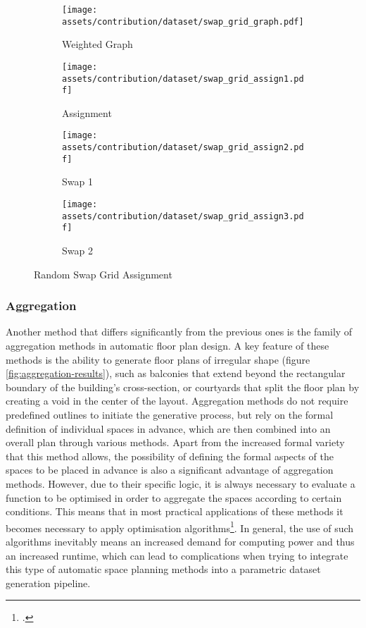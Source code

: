 \documentclass[a4paper, 12pt]{report}
\begin{document}
\begin{figure}
\centering
\begin{subfigure}{.25\textwidth}
\centering
\texttt{[image: assets/contribution/dataset/swap\_grid\_graph.pdf]}
\caption{Weighted Graph}
\label{fig:weighted-graph-3}
\end{subfigure}%
\begin{subfigure}{.25\textwidth}
\centering
\texttt{[image: assets/contribution/dataset/swap\_grid\_assign1.pdf]}
\caption{Assignment}
\label{fig:assignment}
\end{subfigure}%
\begin{subfigure}{.25\textwidth}
\centering
\texttt{[image: assets/contribution/dataset/swap\_grid\_assign2.pdf]}
\caption{Swap 1}
\label{fig:swap-1}
\end{subfigure}%
\begin{subfigure}{.25\textwidth}
\centering
\texttt{[image: assets/contribution/dataset/swap\_grid\_assign3.pdf]}
\caption{Swap 2}
\label{fig:swap-2}
\end{subfigure}
\caption{Random Swap Grid Assignment}
\label{fig:random-swap-grid-assignment}
\end{figure}

\subsubsection{Aggregation}\label{subsubsec:aggregation}

Another method that differs significantly from the previous ones is the family of aggregation methods in automatic floor plan design. A key feature of these methods is the ability to generate floor plans of irregular shape (figure \ref{fig:aggregation-results}), such as balconies that extend beyond the rectangular boundary of the building's cross-section, or courtyards that split the floor plan by creating a void in the center of the layout. Aggregation methods do not require predefined outlines to initiate the generative process, but rely on the formal definition of individual spaces in advance, which are then combined into an overall plan through various methods. Apart from the increased formal variety that this method allows, the possibility of defining the formal aspects of the spaces to be placed in advance is also a significant advantage of aggregation methods. However, due to their specific logic, it is always necessary to evaluate a function to be optimised in order to aggregate the spaces according to certain conditions. This means that in most practical applications of these methods it becomes necessary to apply optimisation algorithms\footcite{nisztuk2019tool}. In general, the use of such algorithms inevitably means an increased demand for computing power and thus an increased runtime, which can lead to complications when trying to integrate this type of automatic space planning methods into a parametric dataset generation pipeline.
\end{document}
